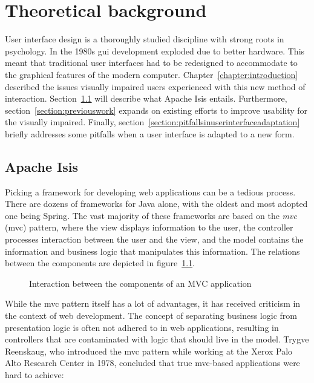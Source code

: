 \chapter{Theoretical background}
\label{chapter:theoreticalbackground}
User interface design is a thoroughly studied discipline with strong roots in psychology. In the 1980s \acrshort{gui} development exploded due to better hardware\cite{myers1998brief}. This meant that traditional user interfaces had to be redesigned to accommodate to the graphical features of the modern computer. Chapter~\ref{chapter:introduction} described the issues visually impaired users experienced with this new method of interaction. Section~\ref{section:apacheisis} will describe what Apache Isis entails. Furthermore, section~\ref{section:previouswork} expands on existing efforts to improve usability for the visually impaired. Finally, section~\ref{section:pitfallsinuserinterfaceadaptation} briefly addresses some pitfalls when a user interface is adapted to a new form.

\section{Apache Isis}
\label{section:apacheisis}
Picking a framework for developing web applications can be a tedious process. There are dozens of frameworks for Java alone, with the oldest and most adopted one being Spring\cite{Sprin96:online}. The vast majority of these frameworks are based on the \textit{\acrlong{mvc}} (\acrshort{mvc}) pattern, where the view displays information to the user, the controller processes interaction between the user and the view, and the model contains the information and business logic that manipulates this information\cite{leff2001web}. The relations between the components are depicted in figure~\ref{figure:mvc}.

\begin{figure}[h]
	\center
	
	\caption{Interaction between the components of an MVC application}
	\label{figure:mvc}
\end{figure}

While the \acrshort{mvc} pattern itself has a lot of advantages, it has received criticism in the context of web development. The concept of separating business logic from presentation logic is often not adhered to in web applications, resulting in controllers that are contaminated with logic that should live in the model\cite{Fulfi2:online}. Trygve Reenskaug, who introduced the \acrshort{mvc} pattern while working at the Xerox Palo Alto Research Center in 1978, concluded that true \acrshort{mvc}-based applications were hard to achieve\cite{reenskaug2007programming}:

